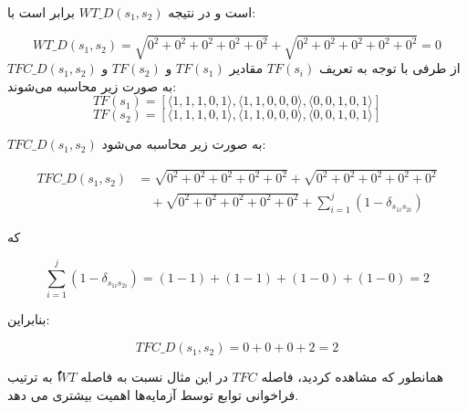 است و در نتیجه \({WT\_D}(s_1, s_2)\) برابر است با:

\[
WT\_D(s_1, s_2) = \sqrt{0^2 + 0^2 + 0^2 + 0^2 + 0^2} + \sqrt{0^2 + 0^2 + 0^2 + 0^2 + 0^2} = 0
\]
\textbf{}
از طرفی با توجه به تعریف \(TF(s_i)\) مقادیر \(TF(s_1)\) و \(TF(s_2)\) و \(TFC\_D(s_1, s_2)\) به صورت زیر محاسبه می‌شوند:
\[
TF(s_1) = \left[\langle 1, 1, 1, 0, 1 \rangle, \langle 1, 1, 0, 0, 0 \rangle, \langle 0, 0, 1, 0, 1 \rangle\right]
\]
\[
TF(s_2) = \left[\langle 1, 1, 1, 0, 1 \rangle, \langle 1, 1, 0, 0, 0 \rangle, \langle 0, 0, 1, 0, 1 \rangle\right]
\]

\(TFC\_D(s_1, s_2)\) به صورت زیر محاسبه می‌شود:

\begin{align*}
	TFC\_D(s_1, s_2) &= \sqrt{0^2 + 0^2 + 0^2 + 0^2 + 0^2} + \sqrt{0^2 + 0^2 + 0^2 + 0^2 + 0^2} \\
	&\quad + \sqrt{0^2 + 0^2 + 0^2 + 0^2 + 0^2} + \sum_{i=1}^{j} \left(1 - \delta_{s_{1i}s_{2i}}\right)
\end{align*}

که

\[
\sum_{i=1}^{j} \left(1 - \delta_{s_{1i}s_{2i}}\right) = (1-1) + (1-1)  + (1-0)  + (1-0) = 2
\]

بنابراین:

\[
TFC\_D(s_1, s_2) = 0 + 0 + 0 + 2 = 2 
\]

همانطور که مشاهده کردید،‌ فاصله \(TFC\) در این مثال نسبت به فاصله \(ٌُWT\)  به ترتیب فراخوانی توابع توسط آزمایه‌ها اهمیت بیشتری می دهد.


\newpage

